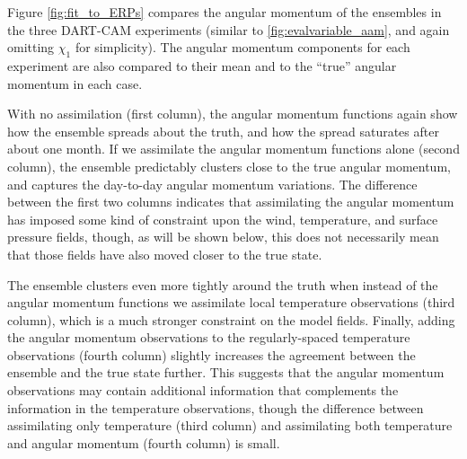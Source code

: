 Figure \ref{fig:fit_to_ERPs} compares the angular momentum of the ensembles in the three DART-CAM experiments (similar to \ref{fig:evalvariable_aam}, and again omitting $\chi_1$ for simplicity). 
The angular momentum components for each experiment are also compared to their mean and to the ``true'' angular momentum in each case.

With no assimilation (first column), the angular momentum functions again show how the ensemble spreads about the truth, and how the spread saturates after about one month.
If we assimilate the angular momentum functions alone (second column), the ensemble predictably clusters close to the true angular momentum, and captures the day-to-day angular momentum variations. 
The difference between the first two columns indicates that assimilating the angular momentum has imposed some kind of constraint upon the wind, temperature, and surface pressure fields, though, as will be shown below, this does not necessarily mean that those fields have also moved closer to the true state. 

The ensemble clusters even more tightly around the truth when instead of the angular momentum functions we assimilate local temperature observations (third column), which is a much stronger constraint on the model fields. 
Finally, adding the angular momentum observations to the regularly-spaced temperature observations (fourth column) slightly increases the agreement between the ensemble and the true state further.  
This suggests that the angular momentum observations may contain additional information that complements the information in the temperature observations, though the difference between assimilating only temperature (third column) and assimilating both temperature and angular momentum (fourth column) is small.  
